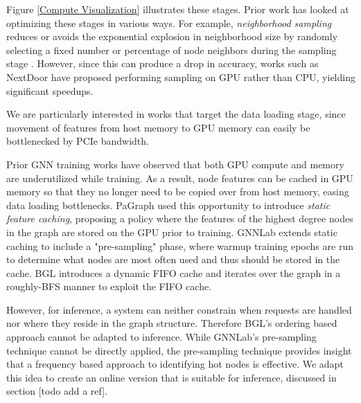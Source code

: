 Figure \ref{Compute Visualization} illustrates these stages. Prior work has looked at optimizing these stages in various ways.
For example, \textit{neighborhood sampling} reduces or avoids the exponential explosion in neighborhood size by randomly selecting a fixed number or percentage of node neighbors during the sampling stage \cite{GraphSAGE_2017}. 
However, since this can produce a drop in accuracy, works such as NextDoor \cite{NextDoor_2021} have proposed performing sampling on GPU rather than CPU, yielding significant speedups.

We are particularly interested in works that target the data loading stage, since movement of features from host memory to GPU memory can easily be bottlenecked by PCIe bandwidth.

Prior GNN training works have observed that both GPU compute and memory are underutilized while training. 
As a result, node features can be cached in GPU memory so that they no longer need to be copied over from host memory, easing data loading bottlenecks.
PaGraph \cite{PaGraph_2020} used this opportunity to introduce \textit{static feature caching}, proposing a policy where the features of the highest degree nodes in the graph are stored on the GPU prior to training. 
GNNLab \cite{GNNLab_2022} extends static caching to include a "pre-sampling" phase, where warmup training epochs are run to determine what nodes are most often used and thus should be stored in the cache.
BGL \cite{BGL_2023} introduces a dynamic FIFO cache and iterates over the graph in a roughly-BFS manner to exploit the FIFO cache.

However, for inference, a system can neither constrain when requests are handled nor where they reside in the graph structure. Therefore BGL's ordering based approach cannot be adapted to inference. While GNNLab's pre-sampling technique cannot be directly applied, the pre-sampling technique provides insight that a frequency based approach to identifying hot nodes is effective. We adapt this idea to create an online version that is suitable for inference, discussed in section [todo add a ref].




